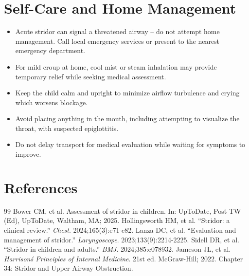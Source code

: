 \section*{Self-Care and Home Management}
\begin{itemize}
  \item Acute stridor can signal a threatened airway -- do not attempt home management. Call local emergency services or present to the nearest emergency department.
  \item For mild croup at home, cool mist or steam inhalation may provide temporary relief while seeking medical assessment.
  \item Keep the child calm and upright to minimize airflow turbulence and crying which worsens blockage.
  \item Avoid placing anything in the mouth, including attempting to visualize the throat, with suspected epiglottitis.
  \item Do not delay transport for medical evaluation while waiting for symptoms to improve.
\end{itemize}

\section*{References}
\begin{thebibliography}{99}
 Bower CM, et al. Assessment of stridor in children. In: UpToDate, Post TW (Ed), UpToDate, Waltham, MA; 2025.
 Hollingsworth HM, et al. ``Stridor: a clinical review.'' \emph{Chest}. 2024;165(3):e71-e82.
 Lanza DC, et al. ``Evaluation and management of stridor.'' \emph{Laryngoscope}. 2023;133(9):2214-2225.
 Sidell DR, et al. ``Stridor in children and adults.'' \emph{BMJ}. 2024;385:e078932.
 Jameson JL, et al. \emph{Harrison\'s Principles of Internal Medicine}. 21st ed. McGraw-Hill; 2022. Chapter 34: Stridor and Upper Airway Obstruction.
\end{thebibliography}
